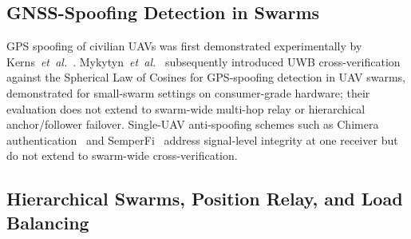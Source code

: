 \documentclass[conference,10pt]{IEEEtran}
\begin{document}
\subsection{GNSS-Spoofing Detection in Swarms}

GPS spoofing of civilian UAVs was first demonstrated experimentally by Kerns~\emph{et~al.}~\cite{kerns2014gpsspoofing}. Mykytyn~\emph{et~al.}~\cite{mykytyn2023gpsspoofing} subsequently introduced UWB cross-verification against the Spherical Law of Cosines for GPS-spoofing detection in UAV swarms, demonstrated for small-swarm settings on consumer-grade hardware; their evaluation does not extend to swarm-wide multi-hop relay or hierarchical anchor/follower failover. Single-UAV anti-spoofing schemes such as Chimera authentication~\cite{dai2023chimera} and SemperFi~\cite{sathaye2022semperfi} address signal-level integrity at one receiver but do not extend to swarm-wide cross-verification.

\subsection{Hierarchical Swarms, Position Relay, and Load Balancing}
\end{document}

